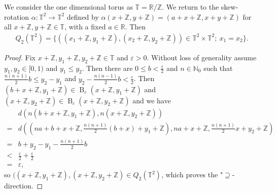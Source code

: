 \begin{example}
	We consider the one dimensional torus as $\mathbb{T} = \mathbb{R}/\mathbb{Z}$. We return to the skew-rotation $\alpha: \mathbb{T}^2 \to \mathbb{T}^2$ defined by $\alpha(x + \mathbb{Z}, y + \mathbb{Z}) = (a + x + \mathbb{Z}, x + y + \mathbb{Z})$ for all $x + \mathbb{Z}, y + \mathbb{Z} \in \mathbb{T}$, with a fixed $a \in \mathbb{R}$. Then
	\begin{align*}
		Q_2(\mathbb{T}^2) = \{((x_1 + \mathbb{Z}, y_1 + \mathbb{Z}), (x_2 + \mathbb{Z}, y_2 + \mathbb{Z})) \in \mathbb{T}^2 \times \mathbb{T}^2;\ x_1=x_2\}.
	\end{align*}
\end{example}
\begin{proof}
	Fix $x + \mathbb{Z}, y_1 + \mathbb{Z}, y_2 + \mathbb{Z} \in \mathbb{T}$ and $\varepsilon > 0$. Without loss of generality assume $y_1, y_2 \in [0, 1)$ and $y_1 \leq y_2$. Then there are $0 \leq b < \frac{\varepsilon}{2}$ and $n \in \mathbb{N}_0$ such that $\frac{n(n+1)}{2}b \leq  y_2 - y_1$ and $y_2 - \frac{n(n-1)}{2}b < \frac{\varepsilon}{2}$. Then $(b + x + \mathbb{Z}, y_1 + \mathbb{Z}) \in \operatorname{B}_\varepsilon(x + \mathbb{Z}, y_1 + \mathbb{Z})$ and $(x + \mathbb{Z}, y_2 + \mathbb{Z}) \in \operatorname{B}_\varepsilon(x + \mathbb{Z}, y_2 + \mathbb{Z})$ and we have
	\begin{align*}
		&d(n(b + x + \mathbb{Z}, y_1 + \mathbb{Z}), n(x + \mathbb{Z}, y_2 + \mathbb{Z}))\\
		= &d((na + b + x + \mathbb{Z}, \frac{n(n+1)}{2}(b+x) + y_1 + \mathbb{Z}), na + x + \mathbb{Z}, \frac{n(n+1)}{2}x + y_2 + \mathbb{Z})\\
		= &b + y_2 - y_1 - \frac{n(n+1)}{2}b\\
		< &\frac{\varepsilon}{2} + \frac{\varepsilon}{2}\\
		= &\varepsilon,
	\end{align*}
	so $((x + \mathbb{Z}, y_1 + \mathbb{Z}), (x + \mathbb{Z}, y_2 + \mathbb{Z}) \in Q_2(\mathbb{T}^2)$, which proves the "$\supseteq$-direction.
	

\end{proof}
